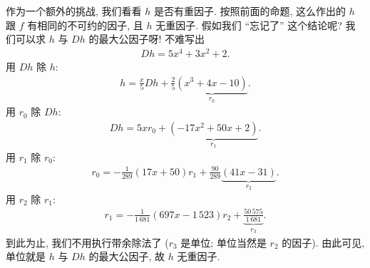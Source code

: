 \begin{example}
    作为一个额外的挑战, 我们看看 $h$ 是否有重因子. 按照前面的命题, 这么作出的 $h$ 跟 $f$ 有相同的不可约的因子, 且 $h$ 无重因子. 假如我们 ``忘记了'' 这个结论呢? 我们可以求 $h$ 与 $Dh$ 的最大公因子呀! 不难写出
    \begin{align*}
        Dh = 5x^4 + 3x^2 + 2.
    \end{align*}
    用 $Dh$ 除 $h$:
    \begin{align*}
        h = \frac{x}{5} Dh + \frac{2}{5} \underbrace{(x^3+4 x-10)}_{r_0}.
    \end{align*}
    用 $r_0$ 除 $Dh$:
    \begin{align*}
        Dh = 5x r_0 + \underbrace{(-17x^2 + 50x + 2)}_{r_1}.
    \end{align*}
    用 $r_1$ 除 $r_0$:
    \begin{align*}
        r_0 = -\frac{1}{289} (17x + 50) r_1 + \frac{90}{289} \underbrace{(41x-31)}_{r_2}.
    \end{align*}
    用 $r_2$ 除 $r_1$:
    \begin{align*}
        r_1 = -\frac{1}{1\,681} (697x - 1\,523) r_2 + \underbrace{\frac{50\,575}{1\,681}}_{r_3}.
    \end{align*}
    到此为止, 我们不用执行带余除法了 ($r_3$ 是单位; 单位当然是 $r_2$ 的因子). 由此可见, 单位就是 $h$ 与 $Dh$ 的最大公因子, 故 $h$ 无重因子.
\end{example}

